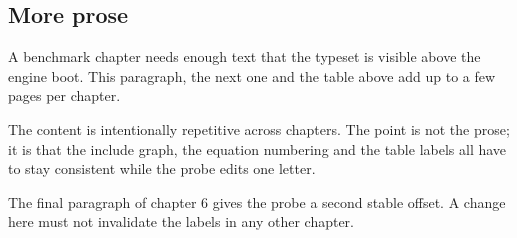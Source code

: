 \subsection{More prose}
A benchmark chapter needs enough text that the type\-set is visible above the
engine boot. This paragraph, the next one and the table above add up to a few
pages per chapter.

The content is intentionally repetitive across chapters. The point is not the
prose; it is that the include graph, the equation numbering and the table
labels all have to stay consistent while the probe edits one letter.

The final paragraph of chapter 6 gives the probe a second stable offset. A
change here must not invalidate the labels in any other chapter.
